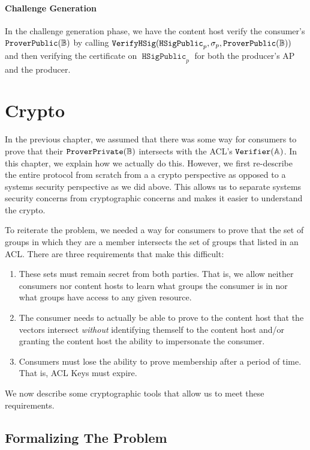 \documentclass[pdftex,12pt,a4papaer,twoside,notitlepage]{report}
\DeclareMathOperator{\vh}{\mathtt{VerifyHSig}}
\DeclareMathOperator{\Hp}{\mathtt{HSigPublic}}
\begin{document}
\subsubsection{Challenge Generation}

In the challenge generation phase, we have the content host verify the
consumer's $\operatorname{\mathtt{ProverPublic}}(\mathbb{B})$ by calling $\vh(\Hp_p, \sigma_p, \Pv)$ and then verifying the
certificate on $\Hp_p$ for both the producer's AP and the producer.

\chapter{Crypto}
\label{chap:crypto}

In the previous chapter, we assumed that there was some way for consumers to
prove that their $\operatorname{\mathtt{ProverPrivate}}(\mathbb{B})$ intersects with the ACL's $\operatorname{\mathtt{Verifier}}(\mathbb{A})$. In this chapter, we
explain how we actually do this. However, we first re-describe the entire
protocol from scratch from a a crypto perspective as opposed to a systems
security perspective as we did above. This allows us to separate systems
security concerns from cryptographic concerns and makes it easier to understand
the crypto.

To reiterate the problem, we needed a way for consumers to prove that the set of
groups in which they are a member intersects the set of groups that listed in an
ACL. There are three requirements that make this difficult:

\begin{enumerate}
\item These sets must remain secret from both parties. That is, we allow neither
  consumers nor content hosts to learn what groups the consumer is in nor what
  groups have access to any given resource.
\item The consumer needs to actually be able to prove to the content host that
  the vectors intersect \emph{without} identifying themself to the content host
  and/or granting the content host the ability to impersonate the consumer.
\item Consumers must lose the ability to prove membership after a period of
  time. That is, ACL Keys must expire.
\end{enumerate}

We now describe some cryptographic tools that allow us to meet these
requirements.

\section{Formalizing The Problem}
\label{sec:reduce-to-math}
\end{document}
